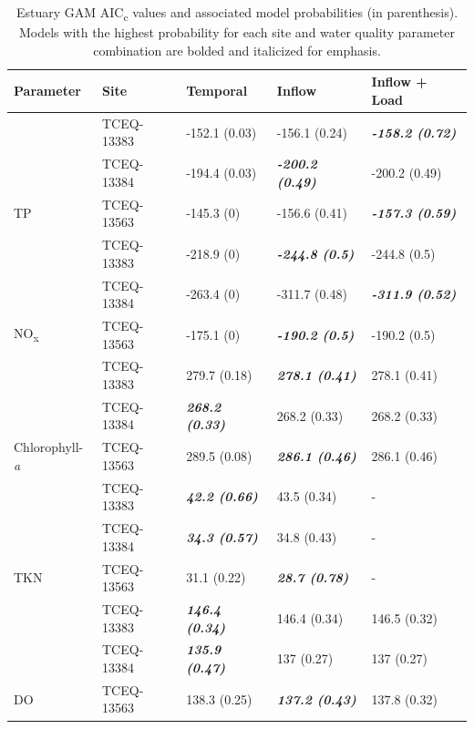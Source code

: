 \documentclass[sn-basic,referee,lineno,pdflatex]{sn-jnl}
\begin{document}
\begin{table}

\caption{\label{tab:table4}Estuary GAM AIC\textsubscript{c} values and associated model probabilities (in parenthesis). Models with the highest probability for each site and water quality parameter combination are bolded and italicized for emphasis.}
\centering
\begin{tabular}[t]{ll>{}l>{}l>{}l}
\toprule
Parameter & Site & Temporal & Inflow & Inflow + Load\\
\midrule
 & TCEQ-13383 & -152.1 (0.03) & -156.1 (0.24) & \em{\textbf{-158.2 (0.72)}}\\

 & TCEQ-13384 & -194.4 (0.03) & \em{\textbf{-200.2 (0.49)}} & -200.2 (0.49)\\

\multirow{-3}{*}{\raggedright\arraybackslash TP} & TCEQ-13563 & -145.3 (0) & -156.6 (0.41) & \em{\textbf{-157.3 (0.59)}}\\
\cmidrule{1-5}
 & TCEQ-13383 & -218.9 (0) & \em{\textbf{-244.8 (0.5)}} & -244.8 (0.5)\\

 & TCEQ-13384 & -263.4 (0) & -311.7 (0.48) & \em{\textbf{-311.9 (0.52)}}\\

\multirow{-3}{*}{\raggedright\arraybackslash NO\textsubscript{x}} & TCEQ-13563 & -175.1 (0) & \em{\textbf{-190.2 (0.5)}} & -190.2 (0.5)\\
\cmidrule{1-5}
 & TCEQ-13383 & 279.7 (0.18) & \em{\textbf{278.1 (0.41)}} & 278.1 (0.41)\\

 & TCEQ-13384 & \em{\textbf{268.2 (0.33)}} & 268.2 (0.33) & 268.2 (0.33)\\

\multirow{-3}{*}{\raggedright\arraybackslash Chlorophyll-\textit{a}} & TCEQ-13563 & 289.5 (0.08) & \em{\textbf{286.1 (0.46)}} & 286.1 (0.46)\\
\cmidrule{1-5}
 & TCEQ-13383 & \em{\textbf{42.2 (0.66)}} & 43.5 (0.34) & -\\

 & TCEQ-13384 & \em{\textbf{34.3 (0.57)}} & 34.8 (0.43) & -\\

\multirow{-3}{*}{\raggedright\arraybackslash TKN} & TCEQ-13563 & 31.1 (0.22) & \em{\textbf{28.7 (0.78)}} & -\\
\cmidrule{1-5}
 & TCEQ-13383 & \em{\textbf{146.4 (0.34)}} & 146.4 (0.34) & 146.5 (0.32)\\

 & TCEQ-13384 & \em{\textbf{135.9 (0.47)}} & 137 (0.27) & 137 (0.27)\\

\multirow{-3}{*}{\raggedright\arraybackslash DO} & TCEQ-13563 & 138.3 (0.25) & \em{\textbf{137.2 (0.43)}} & 137.8 (0.32)\\
\bottomrule
\end{tabular}
\end{table}
\end{document}
